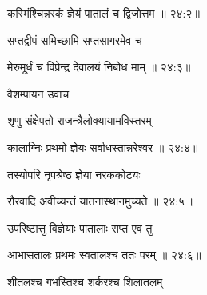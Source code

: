 
{\devanagarifont कस्मिंश्चिन्नरकं ज्ञेयं पातालं च द्विजोत्तम {॥ २४:२॥} \veg\dontdisplaylinenum }%

{\devanagarifont सप्तद्वीपं समिच्छामि सप्तसागरमेव च \thinspace{\dandab} \dontdisplaylinenum }%
 

{\devanagarifont मेरुमूर्धं च विप्रेन्द्र देवालयं निबोध माम् {॥ २४:३॥} \veg\dontdisplaylinenum }%


{\devanagarifont वैशम्पायन उवाच {\dandab}\dontdisplaylinenum  }%
 
{\devanagarifont शृणु संक्षेपतो राजन्त्रैलोक्यायामविस्तरम् \thinspace{\danda} \dontdisplaylinenum }%


{\devanagarifont कालाग्निः प्रथमो ज्ञेयः सर्वाधस्तान्नरेश्वर {॥ २४:४॥} \veg\dontdisplaylinenum }%
 
{\devanagarifont तस्योपरि नृपश्रेष्ठ ज्ञेया नरककोटयः \thinspace{\dandab} \dontdisplaylinenum }%


{\devanagarifont रौरवादि अवीच्यन्तं यातनास्थानमुच्यते {॥ २४:५॥} \veg\dontdisplaylinenum }%
 

{\devanagarifont उपरिष्टात्तु विज्ञेयाः पातालाः सप्त एव तु \thinspace{\dandab} \dontdisplaylinenum }%


{\devanagarifont आभासतालः प्रथमः स्वतालश्च ततः परम् {॥ २४:६॥} \veg\dontdisplaylinenum }%

{\devanagarifont शीतलश्च गभस्तिश्च शर्करश्च शिलातलम् \thinspace{\dandab} \dontdisplaylinenum }%

